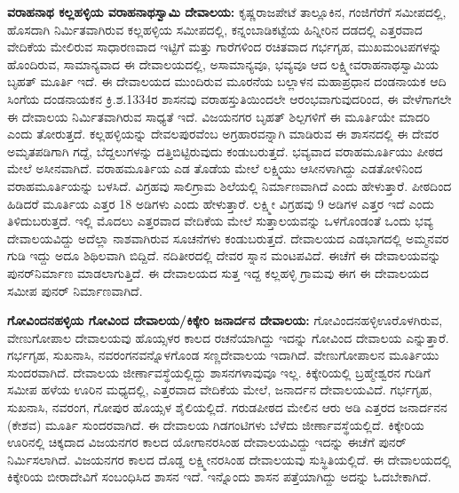 \textbf{ವರಾಹನಾಥ ಕಲ್ಲಹಳ್ಳಿಯ ವರಾಹನಾಥಸ್ವಾಮಿ ದೇವಾಲಯ:} ಕೃಷ್ಣರಾಜಪೇಟೆ ತಾಲ್ಲೂಕಿನ, ಗಂಜಿಗೆರೆಗೆ ಸಮೀಪದಲ್ಲಿ, ಹೊಸದಾಗಿ ನಿರ್ಮಿತವಾಗಿರುವ ಕಲ್ಲಹಳ್ಳಿಯ ಸಮೀಪದಲ್ಲಿ, ಕನ್ನಂಬಾಡಿಕಟ್ಟೆಯ ಹಿನ್ನೀರಿನ ದಡದಲ್ಲಿ ಎತ್ತರವಾದ ವೇದಿಕೆಯ ಮೇಲಿರುವ ಸಾಧಾರಣವಾದ ಇಟ್ಟಿಗೆ ಮತ್ತು ಗಾರೆಗಳಿಂದ ರಚಿತವಾದ ಗರ್ಭಗೃಹ, ಮುಖಮಂಟಪಗಳನ್ನು ಹೊಂದಿರುವ, ಸಾಮಾನ್ಯವಾದ ಈ ದೇವಾಲಯದಲ್ಲಿ, ಅಸಾಮಾನ್ಯವೂ, ಭವ್ಯವೂ ಆದ ಲಕ್ಷ್ಮೀವರಾಹನಾಥಸ್ವಾಮಿಯ ಬೃಹತ್​ ಮೂರ್ತಿ ಇದೆ. ಈ ದೇವಾಲಯದ ಮುಂದಿರುವ ಮೂರನೆಯ ಬಲ್ಲಾಳನ ಮಹಾಪ್ರಧಾನ ದಂಡನಾಯಕ ಆದಿ ಸಿಂಗೆಯ ದಂಡನಾಯಕನ ಕ್ರಿ.ಶ.1334ರ ಶಾಸನವು ವರಾಹಸ್ತುತಿಯಿಂದಲೇ ಆರಂಭವಾಗುವುದರಿಂದ, ಈ ವೇಳೆಗಾಗಲೇ ಈ ದೇವಾಲಯ ನಿರ್ಮಿತವಾಗಿರುವ ಸಾಧ್ಯತೆ ಇದೆ. ವಿಜಯನಗರ ಬೃಹತ್​ ಶಿಲ್ಪಗಳಿಗೆ ಈ ಮೂರ್ತಿಯೇ ಮಾದರಿ ಎಂದು ತೋರುತ್ತದೆ. ಕಲ್ಲಹಳ್ಳಿಯನ್ನು ದೇವಲಪುರವೆಂಬ ಅಗ್ರಹಾರವನ್ನಾಗಿ ಮಾಡಿರುವ ಈ ಶಾಸನದಲ್ಲಿ ಈ ದೇವರ ಅಮೃತಪಡಿಗಾಗಿ ಗದ್ದೆ, ಬೆದ್ದಲುಗಳನ್ನು ದತ್ತಿಬಿಟ್ಟಿರುವುದು ಕಂಡುಬರುತ್ತದೆ. ಭವ್ಯವಾದ ವರಾಹಮೂರ್ತಿಯು ಪೀಠದ ಮೇಲೆ ಅಸೀನವಾಗಿದೆ. ವರಾಹಮೂರ್ತಿಯ ಎಡ ತೊಡೆಯ ಮೇಲೆ ಲಕ್ಷ್ಮಿಯು ಆಸೀನಳಾಗಿದ್ದು ಎಡತೋಳಿನಿಂದ ವರಾಹಮೂರ್ತಿಯನ್ನು ಬಳಸಿದೆ. ವಿಗ್ರಹವು ಸಾಲಿಗ್ರಾಮ ಶಿಲೆಯಲ್ಲಿ ನಿರ್ಮಾಣವಾಗಿದೆ ಎಂದು ಹೇಳುತ್ತಾರೆ. ಪೀಠದಿಂದ ಹಿಡಿದರೆ ಮೂರ್ತಿಯ ಎತ್ತರ 18 ಅಡಿಗಳು ಎಂದು ಹೇಳುತ್ತಾರೆ. ಲಕ್ಷ್ಮೀ ವಿಗ್ರಹವು 9 ಅಡಿಗಳ ಎತ್ತರ ಇದೆ ಎಂದು ತಿಳಿದುಬರುತ್ತದೆ. ಇಲ್ಲಿ ಮೊದಲು ಎತ್ತರವಾದ ವೇದಿಕೆಯ ಮೇಲೆ ಸುತ್ತಾಲಯವನ್ನು ಒಳಗೊಂಡಂತೆ ಒಂದು ಭವ್ಯ ದೇವಾಲಯವಿದ್ದು ಅದೆಲ್ಲಾ ನಾಶವಾಗಿರುವ ಸೂಚನೆಗಳು ಕಂಡುಬರುತ್ತದೆ. ದೇವಾಲಯದ ಎಡಭಾಗದಲ್ಲಿ ಅಮ್ಮನವರ ಗುಡಿ ಇದ್ದು ಅದೂ ಶಿಥಿಲವಾಗಿ ಬಿದ್ದಿದೆ. ನದಿತೀರದಲ್ಲಿ ದೇವರ ಸ್ನಾನ ಮಂಟಪವಿದೆ. ಈಚೆಗೆ ಈ ದೇವಾಲಯವನ್ನು ಪುನರ್​ನಿರ್ಮಾಣ ಮಾಡಲಾಗುತ್ತಿದೆ. ಈ ದೇವಾಲಯದ ಸುತ್ತ ಇದ್ದ ಕಲ್ಲಹಳ್ಳಿ ಗ್ರಾಮವು ಈಗ ಈ ದೇವಾಲಯದ ಸಮೀಪ ಪುನರ್​ ನಿರ್ಮಾಣವಾಗಿದೆ.

\textbf{ಗೋವಿಂದನಹಳ್ಳಿಯ ಗೋವಿಂದ ದೇವಾಲಯ/ಕಿಕ್ಕೇರಿ ಜನಾರ್ದನ ದೇವಾಲಯ:} ಗೋವಿಂದನಹಳ್ಳಿ\break ಊರೊಳಗಿರುವ, ವೇಣುಗೋಪಾಲ ದೇವಾಲಯವು ಹೊಯ್ಸಳರ ಕಾಲದ ರಚನೆಯಾಗಿದ್ದು ಇದನ್ನು ಗೋವಿಂದ ದೇವಾಲಯ ಎನ್ನುತ್ತಾರೆ. ಗರ್ಭಗೃಹ, ಸುಖನಾಸಿ, ನವರಂಗನವನ್ನೊಳಗೊಂಡ ಸಣ್ಣದೇವಾಲಯ ಇದಾಗಿದೆ. ವೇಣುಗೋಪಾಲನ ಮೂರ್ತಿಯು ಸುಂದರವಾಗಿದೆ. ದೇವಾಲಯ ಜೀರ್ಣಾವಸ್ಥೆಯಲ್ಲಿದ್ದು ಶಾಸನಗಳಾವುವೂ ಇಲ್ಲ. ಕಿಕ್ಕೇರಿಯಲ್ಲಿ ಬ್ರಹ್ಮೇಶ್ವರನ ಗುಡಿಗೆ ಸಮೀಪ ಹಳೆಯ ಊರಿನ ಮಧ್ಯದಲ್ಲಿ, ಎತ್ತರವಾದ ವೇದಿಕೆಯ ಮೇಲೆ, ಜನಾರ್ದನ ದೇವಾಲಯವಿದೆ. ಗರ್ಭಗೃಹ, ಸುಖನಾಸಿ, ನವರಂಗ, ಗೋಪುರ ಹೊಯ್ಸಳ ಶೈಲಿಯಲ್ಲಿದೆ. ಗರುಡಪೀಠದ ಮೇಲಿನ ಆರು ಅಡಿ ಎತ್ತರದ ಜನಾರ್ದನನ (ಕೇಶವ) ಮೂರ್ತಿ ಸುಂದರವಾಗಿದೆ. ಈ ದೇವಾಲಯ ಗಿಡಗಂಟಿಗಳು ಬೆಳೆದು ಜೀರ್ಣಾವಸ್ಥೆಯಲ್ಲಿದೆ. ಕಿಕ್ಕೇರಿಯ ಊರಿನಲ್ಲಿ ಚಿಕ್ಕದಾದ ವಿಜಯನಗರ ಕಾಲದ ಯೋಗಾನರಸಿಂಹ ದೇವಾಲಯವಿದ್ದು ಇದನ್ನು ಈಚೆಗೆ ಪುನರ್ ನಿರ್ಮಿಸಲಾಗಿದೆ. ವಿಜಯನಗರ ಕಾಲದ ದೊಡ್ಡ ಲಕ್ಷ್ಮೀನರಸಿಂಹ ದೇವಾಲಯವು ಸುಸ್ಥಿತಿಯಲ್ಲಿದೆ. ಈ ದೇವಾಲಯದಲ್ಲಿ ಕಿಕ್ಕೇರಿಯ ಬೀರಾದೇವಿಗೆ ಸಂಬಂಧಿಸಿದ ಶಾಸನ ಇದೆ. ಇನ್ನೊಂದು ಶಾಸನ ಪತ್ತೆಯಾಗಿದ್ದು ಅದನ್ನು ಓದಬೇಕಾಗಿದೆ.

